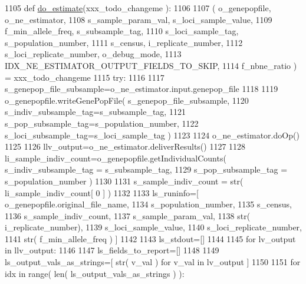 \begin{DoxyCode}
1105 \textcolor{keyword}{def }\hyperlink{namespacenegui_1_1pgdriveneestimator_aeb13bee850fbafd8116a6b7e8048b98c}{do\_estimate}(xxx\_todo\_changeme ):
1106 
1107     ( o\_genepopfile, o\_ne\_estimator, 
1108                     s\_sample\_param\_val, s\_loci\_sample\_value,
1109                     f\_min\_allele\_freq, s\_subsample\_tag, 
1110                     s\_loci\_sample\_tag, s\_population\_number, 
1111                     s\_census, i\_replicate\_number, 
1112                     s\_loci\_replicate\_number, o\_debug\_mode, 
1113                         IDX\_NE\_ESTIMATOR\_OUTPUT\_FIELDS\_TO\_SKIP,
1114                         f\_nbne\_ratio ) = xxx\_todo\_changeme
1115     \textcolor{keywordflow}{try}:
1116 
1117         s\_genepop\_file\_subsample=o\_ne\_estimator.input.genepop\_file
1118 
1119         o\_genepopfile.writeGenePopFile( s\_genepop\_file\_subsample, 
1120                                 s\_indiv\_subsample\_tag=s\_subsample\_tag,
1121                                 s\_pop\_subsample\_tag=s\_population\_number,
1122                                 s\_loci\_subsample\_tag=s\_loci\_sample\_tag ) 
1123 
1124         o\_ne\_estimator.doOp()
1125 
1126         llv\_output=o\_ne\_estimator.deliverResults()
1127 
1128         li\_sample\_indiv\_count=o\_genepopfile.getIndividualCounts( s\_indiv\_subsample\_tag = s\_subsample\_tag, 
1129                                                                     s\_pop\_subsample\_tag = 
      s\_population\_number )
1130 
1131         s\_sample\_indiv\_count = str( li\_sample\_indiv\_count[ 0 ] )
1132 
1133         ls\_runinfo=[ o\_genepopfile.original\_file\_name, 
1134                                     s\_population\_number, 
1135                                     s\_census,
1136                                     s\_sample\_indiv\_count, 
1137                                     s\_sample\_param\_val, 
1138                                     str( i\_replicate\_number), 
1139                                     s\_loci\_sample\_value,
1140                                     s\_loci\_replicate\_number,
1141                                     str( f\_min\_allele\_freq ) ]
1142         
1143         ls\_stdout=[]
1144 
1145         \textcolor{keywordflow}{for} lv\_output \textcolor{keywordflow}{in} llv\_output:
1146 
1147             ls\_fields\_to\_report=[]  
1148 
1149             ls\_output\_vals\_as\_strings=[ str( v\_val ) \textcolor{keywordflow}{for} v\_val \textcolor{keywordflow}{in} lv\_output ]
1150 
1151             \textcolor{keywordflow}{for} idx \textcolor{keywordflow}{in} range( len( ls\_output\_vals\_as\_strings ) ):

\end{DoxyCode}
